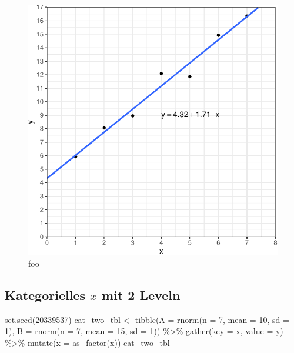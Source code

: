 \documentclass[
  letterpaper,
]{scrbook}
\newenvironment{Shaded}{\begin{snugshade}}{\end{snugshade}}
\newcommand{\AttributeTok}[1]{\textcolor[rgb]{0.40,0.45,0.13}{#1}}
\newcommand{\DecValTok}[1]{\textcolor[rgb]{0.68,0.00,0.00}{#1}}
\newcommand{\FunctionTok}[1]{\textcolor[rgb]{0.28,0.35,0.67}{#1}}
\newcommand{\NormalTok}[1]{\textcolor[rgb]{0.00,0.23,0.31}{#1}}
\newcommand{\OtherTok}[1]{\textcolor[rgb]{0.00,0.23,0.31}{#1}}
\newcommand{\SpecialCharTok}[1]{\textcolor[rgb]{0.37,0.37,0.37}{#1}}
\begin{document}
\begin{figure}[H]

{\centering \includegraphics{./stat-modeling-basic_files/figure-pdf/fig-stat-modeling-basic-00-1.pdf}

}

\caption{\label{fig-stat-modeling-basic-00}foo}

\end{figure}

\hypertarget{sec-interpret-x-cat2}{%
\subsection{\texorpdfstring{Kategorielles \(x\) mit 2
Leveln}{Kategorielles x mit 2 Leveln}}\label{sec-interpret-x-cat2}}

\begin{Shaded}
\begin{Highlighting}[]
\FunctionTok{set.seed}\NormalTok{(}\DecValTok{20339537}\NormalTok{)}
\NormalTok{cat\_two\_tbl }\OtherTok{\textless{}{-}} \FunctionTok{tibble}\NormalTok{(}\AttributeTok{A =} \FunctionTok{rnorm}\NormalTok{(}\AttributeTok{n =} \DecValTok{7}\NormalTok{, }\AttributeTok{mean =} \DecValTok{10}\NormalTok{, }\AttributeTok{sd =} \DecValTok{1}\NormalTok{),}
                      \AttributeTok{B =} \FunctionTok{rnorm}\NormalTok{(}\AttributeTok{n =} \DecValTok{7}\NormalTok{, }\AttributeTok{mean =} \DecValTok{15}\NormalTok{, }\AttributeTok{sd =} \DecValTok{1}\NormalTok{)) }\SpecialCharTok{\%\textgreater{}\%} 
  \FunctionTok{gather}\NormalTok{(}\AttributeTok{key =}\NormalTok{ x, }\AttributeTok{value =}\NormalTok{ y) }\SpecialCharTok{\%\textgreater{}\%} 
  \FunctionTok{mutate}\NormalTok{(}\AttributeTok{x =} \FunctionTok{as\_factor}\NormalTok{(x))}
\NormalTok{cat\_two\_tbl}
\end{Highlighting}
\end{Shaded}
\end{document}
